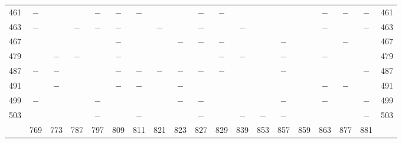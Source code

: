 \begin{center}
\begin{tabular}{r|c|c|c|c|c|c|c|c|c|c|c|c|c|c|c|c|c|r}
461 & $-$ &  &  & $-$ & $-$ & $-$ &  &  & $-$ & $-$ &  &  &  &  & $-$ & $-$ & $-$ & 461\\
463 & $-$ &  & $-$ & $-$ & $-$ &  & $-$ &  & $-$ &  & $-$ &  &  &  & $-$ &  & $-$ & 463\\
467 &  &  &  &  & $-$ &  &  & $-$ & $-$ & $-$ &  &  & $-$ &  &  & $-$ &  & 467\\
479 &  & $-$ & $-$ &  & $-$ &  &  &  &  & $-$ & $-$ &  & $-$ &  & $-$ &  &  & 479\\
487 & $-$ & $-$ &  &  & $-$ & $-$ & $-$ & $-$ & $-$ & $-$ &  &  & $-$ &  &  &  & $-$ & 487\\
491 &  & $-$ &  &  & $-$ & $-$ &  & $-$ &  &  &  &  &  &  & $-$ & $-$ &  & 491\\
499 & $-$ &  &  & $-$ &  &  &  & $-$ & $-$ &  &  &  & $-$ &  & $-$ &  & $-$ & 499\\
503 &  &  &  & $-$ &  & $-$ &  &  & $-$ &  & $-$ & $-$ & $-$ &  &  &  & $-$ & 503\\
\hline
 & 769 & 773 & 787 & 797 & 809 & 811 & 821 & 823 & 827 & 829 & 839 & 853 & 857 & 859 & 863 & 877 & 881 & \\
\hline
\end{tabular}\endgroup\end{center}
\clearpage
